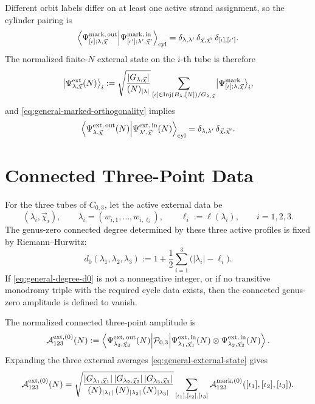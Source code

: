 \documentclass[11pt]{article}
\newcommand{\mc}[1]{\mathcal{#1}}
\newcommand{\Inj}{\mathrm{Inj}}
\begin{document}
Different orbit labels differ on at least one active strand assignment, so the cylinder pairing is
\begin{equation}\label{eq:general-marked-orthogonality}
\left\langle
\Psi^{\rm mark,\,out}_{[\iota];\lambda,\vec\chi}
\middle|
\Psi^{\rm mark,\,in}_{[\iota'];\lambda',\vec\chi'}
\right\rangle_{\rm cyl}
=
\delta_{\lambda,\lambda'}\,
\delta_{\vec\chi,\vec\chi'}\,
\delta_{[\iota],[\iota']}.
\end{equation}
The normalized finite-$N$ external state on the $i$-th tube is therefore
\begin{equation}\label{eq:general-external-state}
\bigl|\Psi^{\rm ext}_{\lambda,\vec\chi}(N)\bigr\rangle_i
:=
\sqrt{
\frac{|G_{\lambda,\vec\chi}|}{(N)_{|\lambda|}}
}
\sum_{[\iota]\in \Inj(B_\lambda,[N]) / G_{\lambda,\vec\chi}}
\bigl|\Psi^{\rm mark}_{[\iota];\lambda,\vec\chi}\bigr\rangle_i,
\end{equation}
and \eqref{eq:general-marked-orthogonality} implies
\begin{equation}\label{eq:general-external-state-unit-norm}
\left\langle
\Psi^{\rm ext,\,out}_{\lambda,\vec\chi}(N)
\middle|
\Psi^{\rm ext,\,in}_{\lambda',\vec\chi'}(N)
\right\rangle_{\rm cyl}
=
\delta_{\lambda,\lambda'}\,
\delta_{\vec\chi,\vec\chi'}.
\end{equation}

\section{Connected Three-Point Data}
For the three tubes of $C_{0,3}$, let the active external data be
\[
(\lambda_i,\vec\chi_i),
\qquad
\lambda_i=(w_{i,1},\dots,w_{i,\ell_i}),
\qquad
\ell_i:=\ell(\lambda_i),
\qquad
i=1,2,3.
\]
The genus-zero connected degree determined by these three active profiles is fixed by Riemann--Hurwitz:
\begin{equation}\label{eq:general-degree-d0}
d_0(\lambda_1,\lambda_2,\lambda_3)
:=
1+\frac12\sum_{i=1}^3\bigl(|\lambda_i|-\ell_i\bigr).
\end{equation}
If \eqref{eq:general-degree-d0} is not a nonnegative integer, or if no transitive monodromy triple with the required cycle data exists, then the connected genus-zero amplitude is defined to vanish.

The normalized connected three-point amplitude is
\begin{equation}\label{eq:general-external-amplitude}
\mc A_{123}^{\rm ext,(0)}(N)
:=
\left\langle
\Psi^{\rm ext,\,out}_{\lambda_3,\vec\chi_3}(N)
\middle|
\mc P_{0,3}
\middle|
\Psi^{\rm ext,\,in}_{\lambda_1,\vec\chi_1}(N)\otimes
\Psi^{\rm ext,\,in}_{\lambda_2,\vec\chi_2}(N)
\right\rangle.
\end{equation}
Expanding the three external averages \eqref{eq:general-external-state} gives
\begin{equation}\label{eq:general-external-amplitude-expanded}
\mc A_{123}^{\rm ext,(0)}(N)
=
\sqrt{
\frac{
|G_{\lambda_1,\vec\chi_1}|\,
|G_{\lambda_2,\vec\chi_2}|\,
|G_{\lambda_3,\vec\chi_3}|
}{
(N)_{|\lambda_1|}\,
(N)_{|\lambda_2|}\,
(N)_{|\lambda_3|}
}
}
\sum_{[\iota_1],[\iota_2],[\iota_3]}
\mc A_{123}^{\rm mark,(0)}([\iota_1],[\iota_2],[\iota_3]).
\end{equation}
\end{document}
